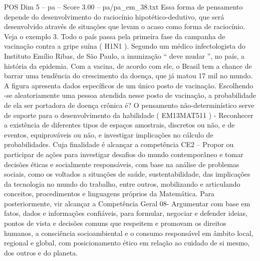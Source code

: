 \begin{textsample}{POS Dim 5 – pa – Score 3.00 – pa/pa\_em\_38.txt}
Essa forma de pensamento depende do desenvolvimento do raciocínio hipotético-dedutivo, que será desenvolvido através de situações que levam o acaso como forma de raciocínio.
Veja o exemplo 3.
Todo o país passa pela primeira fase da campanha de vacinação contra a gripe suína ( H1N1 ).
Segundo um médico infectologista do Instituto Emílio Ribas, de São Paulo, a imunização “ deve mudar ”, no país, a história da epidemia.
Com a vacina, de acordo com ele, o Brasil tem a chance de barrar uma tendência do crescimento da doença, que já matou 17 mil no mundo.
A figura apresenta dados específicos de um único posto de vacinação.
Escolhendo -se aleatoriamente uma pessoa atendida nesse posto de vacinação, a probabilidade de ela ser portadora de doença crônica é?
O pensamento não-determinístico serve de suporte para o desenvolvimento da habilidade ( EM13MAT511 ) - Reconhecer a existência de diferentes tipos de espaços amostrais, discretos ou não, e de eventos, equiprováveis ou não, e investigar implicações no cálculo de probabilidades.
Cuja finalidade é alcançar a competência CE2 – Propor ou participar de ações para investigar desafios do mundo contemporâneo e tomar decisões éticas e socialmente responsáveis, com base na análise de problemas sociais, como os voltados a situações de saúde, sustentabilidade, das implicações da tecnologia no mundo do trabalho, entre outros, mobilizando e articulando conceitos, procedimentos e linguagens próprios da Matemática.
Para posteriormente, vir alcançar a Competência Geral 08- Argumentar com base em fatos, dados e informações confiáveis, para formular, negociar e defender ideias, pontos de vista e decisões comuns que respeitem e promovam os direitos humanos, a consciência socioambiental e o consumo responsável em âmbito local, regional e global, com posicionamento ético em relação ao cuidado de si mesmo, dos outros e do planeta.

\end{textsample}
